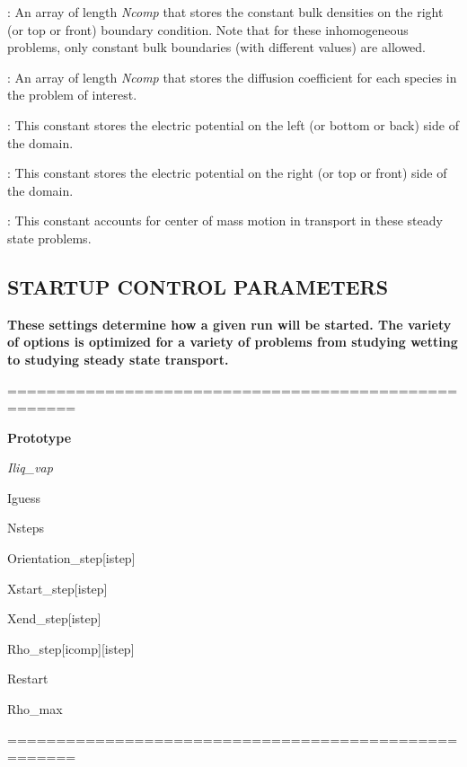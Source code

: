\documentclass[10pt,onecolumn]{article}
\begin{document}
\vspace{0.1in}
:  An array of length {\it Ncomp} that
stores the constant bulk densities on the right (or top or front)
boundary condition.  Note that for these inhomogeneous problems,
only constant bulk boundaries (with different values) are allowed.

\vspace{0.1in}
:  An array of length {\it Ncomp} that
stores the diffusion coefficient for each species in the problem
of interest.

\vspace{0.1in}
:  This constant stores the electric
potential on the left (or bottom or back) side of the domain.

\vspace{0.1in}
:  This constant stores the electric
potential on the right (or top or front) side of the domain.

\vspace{0.1in}
:  This constant accounts for center of
mass motion in transport in these steady state problems.

\vfill
\break

\subsection{STARTUP CONTROL PARAMETERS}
{\bf  These settings determine
how a given run will be started.  The variety of options is
optimized for a variety of problems from studying wetting to
studying steady state transport.}

\noindent=====================================================

{\bf Prototype}

{\it Iliq\_vap

Iguess

Nsteps

Orientation\_step[istep]

Xstart\_step[istep]

Xend\_step[istep]

Rho\_step[icomp][istep]

Restart

 Rho\_max

}

\noindent=====================================================
\end{document}
